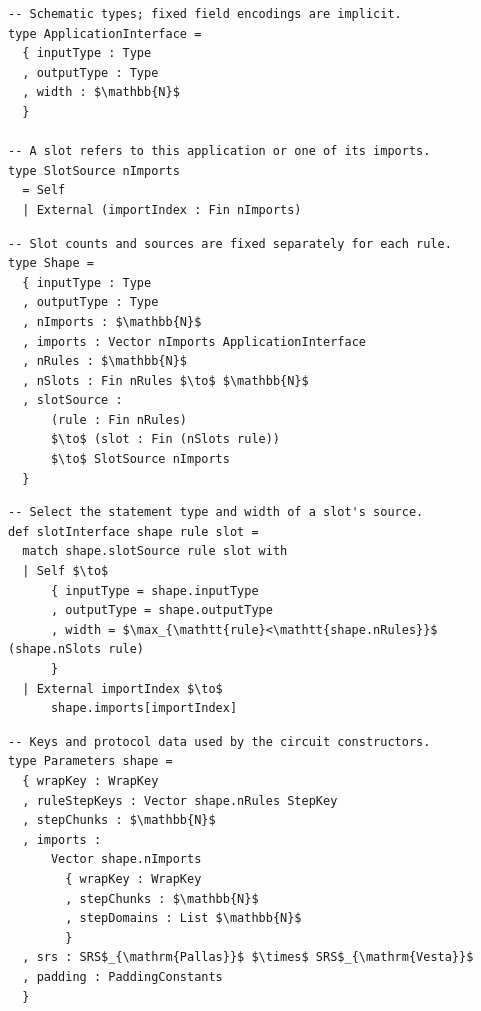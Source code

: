\documentclass[11pt,a4paper]{article}
\newenvironment{schematicblock}
  {\par\noindent\begin{minipage}{\linewidth}}
  {\end{minipage}\par}
\theoremstyle{definition}
\theoremstyle{insetstatement}
\begin{document}
\begin{schematicblock}
\begin{lstlisting}[style=schematic]
-- Schematic types; fixed field encodings are implicit.
type ApplicationInterface =
  { inputType : Type
  , outputType : Type
  , width : $\mathbb{N}$
  }

-- A slot refers to this application or one of its imports.
type SlotSource nImports
  = Self
  | External (importIndex : Fin nImports)
\end{lstlisting}
\end{schematicblock}

\begin{schematicblock}
\begin{lstlisting}[style=schematic]
-- Slot counts and sources are fixed separately for each rule.
type Shape =
  { inputType : Type
  , outputType : Type
  , nImports : $\mathbb{N}$
  , imports : Vector nImports ApplicationInterface
  , nRules : $\mathbb{N}$
  , nSlots : Fin nRules $\to$ $\mathbb{N}$
  , slotSource :
      (rule : Fin nRules)
      $\to$ (slot : Fin (nSlots rule))
      $\to$ SlotSource nImports
  }
\end{lstlisting}
\end{schematicblock}

\begin{schematicblock}
\begin{lstlisting}[style=schematic]
-- Select the statement type and width of a slot's source.
def slotInterface shape rule slot =
  match shape.slotSource rule slot with
  | Self $\to$
      { inputType = shape.inputType
      , outputType = shape.outputType
      , width = $\max_{\mathtt{rule}<\mathtt{shape.nRules}}$ (shape.nSlots rule)
      }
  | External importIndex $\to$
      shape.imports[importIndex]
\end{lstlisting}
\end{schematicblock}

\begin{schematicblock}
\begin{lstlisting}[style=schematic]
-- Keys and protocol data used by the circuit constructors.
type Parameters shape =
  { wrapKey : WrapKey
  , ruleStepKeys : Vector shape.nRules StepKey
  , stepChunks : $\mathbb{N}$
  , imports :
      Vector shape.nImports
        { wrapKey : WrapKey
        , stepChunks : $\mathbb{N}$
        , stepDomains : List $\mathbb{N}$
        }
  , srs : SRS$_{\mathrm{Pallas}}$ $\times$ SRS$_{\mathrm{Vesta}}$
  , padding : PaddingConstants
  }
\end{lstlisting}
\end{schematicblock}
\end{document}
